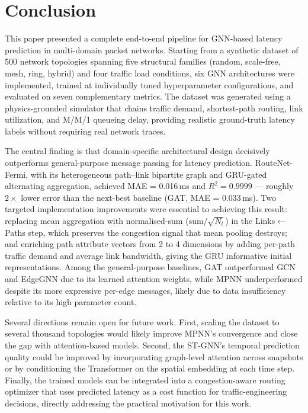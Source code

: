 \documentclass[12pt]{article}
\begin{document}
\section{Conclusion}
\label{sec:conclusion}

This paper presented a complete end-to-end pipeline for GNN-based latency prediction in multi-domain packet networks. Starting from a synthetic dataset of 500 network topologies spanning five structural families (random, scale-free, mesh, ring, hybrid) and four traffic load conditions, six GNN architectures were implemented, trained at individually tuned hyperparameter configurations, and evaluated on seven complementary metrics. The dataset was generated using a physics-grounded simulator that chains traffic demand, shortest-path routing, link utilization, and M/M/1 queueing delay, providing realistic ground-truth latency labels without requiring real network traces.

The central finding is that domain-specific architectural design decisively outperforms general-purpose message passing for latency prediction. RouteNet-Fermi, with its heterogeneous path--link bipartite graph and GRU-gated alternating aggregation, achieved MAE = 0.016\,ms and $R^2 = 0.9999$ --- roughly $2\times$ lower error than the next-best baseline (GAT, MAE = 0.033\,ms). Two targeted implementation improvements were essential to achieving this result: replacing mean aggregation with normalised-sum ($\mathrm{sum}/\sqrt{N_l}$) in the Links$\leftarrow$Paths step, which preserves the congestion signal that mean pooling destroys; and enriching path attribute vectors from 2 to 4 dimensions by adding per-path traffic demand and average link bandwidth, giving the GRU informative initial representations. Among the general-purpose baselines, GAT outperformed GCN and EdgeGNN due to its learned attention weights, while MPNN underperformed despite its more expressive per-edge messages, likely due to data insufficiency relative to its high parameter count.

Several directions remain open for future work. First, scaling the dataset to several thousand topologies would likely improve MPNN's convergence and close the gap with attention-based models. Second, the ST-GNN's temporal prediction quality could be improved by incorporating graph-level attention across snapshots or by conditioning the Transformer on the spatial embedding at each time step. Finally, the trained models can be integrated into a congestion-aware routing optimizer that uses predicted latency as a cost function for traffic-engineering decisions, directly addressing the practical motivation for this work.

\newpage


\end{document}
